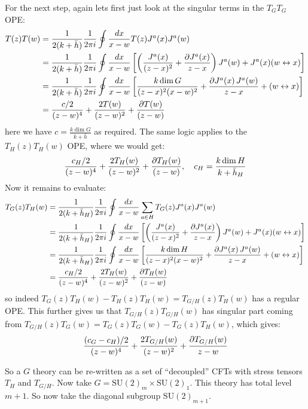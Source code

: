 \documentclass[11pt]{article}
\begin{document}
\begin{enumerate}
	For the next step, again lets first just look at the singular terms in the $T_G T_G$ OPE:
	\[
	\begin{aligned}
		T(z) T(w) &= \frac{1}{2 (k + \bar h)} \frac{1}{2\pi i} \oint \frac{dx}{x-w} T(z) J^a(x) J^a(w)\\
		&= \frac{1}{2 (k + \bar h)} \frac{1}{2\pi i} \oint \frac{dx}{x-w} \left[  \left(\frac{J^a(x)}{(z-x)^2} + \frac{\partial J^a(x)}{z-x} \right) J^a(w) + J^a(x) (w \leftrightarrow x) \right]\\
		&=  \frac{1}{2 (k + \bar h)} \frac{1}{2\pi i} \oint \frac{dx}{x-w} \left[ \frac{k \dim G}{(z-x)^2 (x-w)^2} + \frac{\partial J^a(x)\, J^a(w)}{z-x} + (w \leftrightarrow x) \right]\\
		&= \frac{c/2}{(z-w)^4} + \frac{2 T(w)}{(z-w)^2} + \frac{\partial T(w)}{(z-w)}
	\end{aligned}
	\]
	here we have $c = \frac{k \dim G}{k + \bar h}$ as required. The same logic applies to the $T_H(z) T_H(w)$ OPE, where we would get:
	\[
		\frac{c_H/2}{(z-w)^4} + \frac{2 T_H(w)}{(z-w)^2} + \frac{\partial T_H(w)}{(z-w)}, \quad c_H = \frac{k \dim H}{k + \bar h_H}
	\]
	Now it remains to evaluate:
	\[
	\begin{aligned}
		T_G(z) T_H(w) &= \frac{1}{2 (k + \bar h_H)} \frac{1}{2\pi i} \oint \frac{dx}{x-w} \sum_{a \in H} T_G(z) J^a(x) J^a(w)\\
		&= \frac{1}{2 (k + \bar h_H)} \frac{1}{2\pi i} \oint \frac{dx}{x-w} \left[  \left(\frac{J^a(x)}{(z-x)^2} + \frac{\partial J^a(x)}{z-x} \right) J^a(w) + J^a(x) (w \leftrightarrow x) \right]\\
		&=  \frac{1}{2 (k + \bar h_H)} \frac{1}{2\pi i} \oint \frac{dx}{x-w} \left[ \frac{k \dim H}{(z-x)^2 (x-w)^2} + \frac{\partial J^a(x)\, J^a(w)}{z-x} + (w \leftrightarrow x) \right]\\
		&= \frac{c_H/2}{(z-w)^4} + \frac{2 T_H(w)}{(z-w)^2} + \frac{\partial T_H(w)}{(z-w)}
	\end{aligned}
	\]
	so indeed $T_G(z) T_H(w) - T_H(z) T_H(w) = T_{G/H}(z) T_H(w)$ has a regular OPE. This further gives us that $T_{G/H}(z) T_{G/H}(w)$ has singular part coming from $T_{G/H}(z) T_G(w)= T_G(z) T_G(w) - T_G(z) T_H(w)$, which gives:
	\[
		\frac{(c_G-c_H)/2}{(z-w)^4} + \frac{2 T_{G/H}(w)}{(z-w)^2} + \frac{\partial T_{G/H}(w)}{z-w}
	\]
	
	So a $G$ theory can be re-written as a set of ``decoupled'' CFTs with stress tensors $T_H$ and $T_{G/H}$. Now take $G = \mathrm{SU}(2)_{m} \times \mathrm{SU}(2)_1$. This theory has total level $m+1$. So now take the diagonal subgroup $\mathrm{SU}(2)_{m+1}$.
	

\end{enumerate}
\end{document}
